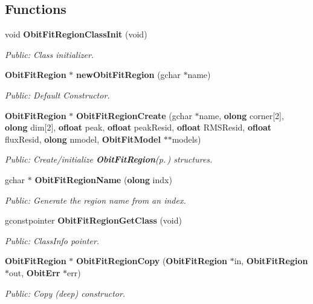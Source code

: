 \subsection*{Functions}
\begin{CompactItemize}
\item 
void {\bf Obit\-Fit\-Region\-Class\-Init} (void)
\begin{CompactList}\small\item\em Public: Class initializer. \item\end{CompactList}\item 
{\bf Obit\-Fit\-Region} $\ast$ {\bf new\-Obit\-Fit\-Region} (gchar $\ast$name)
\begin{CompactList}\small\item\em Public: Default Constructor. \item\end{CompactList}\item 
{\bf Obit\-Fit\-Region} $\ast$ {\bf Obit\-Fit\-Region\-Create} (gchar $\ast$name, {\bf olong} corner[2], {\bf olong} dim[2], {\bf ofloat} peak, {\bf ofloat} peak\-Resid, {\bf ofloat} RMSResid, {\bf ofloat} flux\-Resid, {\bf olong} nmodel, {\bf Obit\-Fit\-Model} $\ast$$\ast$models)
\begin{CompactList}\small\item\em Public: Create/initialize {\bf Obit\-Fit\-Region}{\rm (p.\,\pageref{structObitFitRegion})} structures. \item\end{CompactList}\item 
gchar $\ast$ {\bf Obit\-Fit\-Region\-Name} ({\bf olong} indx)
\begin{CompactList}\small\item\em Public: Generate the region name from an index. \item\end{CompactList}\item 
gconstpointer {\bf Obit\-Fit\-Region\-Get\-Class} (void)
\begin{CompactList}\small\item\em Public: Class\-Info pointer. \item\end{CompactList}\item 
{\bf Obit\-Fit\-Region} $\ast$ {\bf Obit\-Fit\-Region\-Copy} ({\bf Obit\-Fit\-Region} $\ast$in, {\bf Obit\-Fit\-Region} $\ast$out, {\bf Obit\-Err} $\ast$err)
\begin{CompactList}\small\item\em Public: Copy (deep) constructor. \item\end{CompactList}\item 
$$
\end{CompactItemize}
